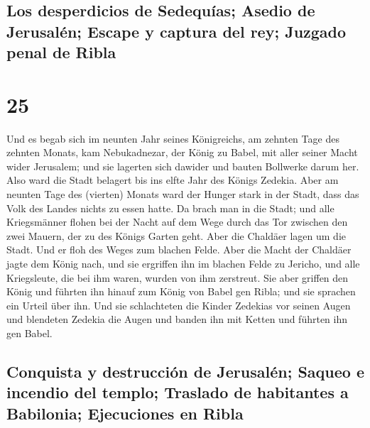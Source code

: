 \hypertarget{los-desperdicios-de-sedequuxedas-asedio-de-jerusaluxe9n-escape-y-captura-del-rey-juzgado-penal-de-ribla}{%
\subsection{Los desperdicios de Sedequías; Asedio de Jerusalén; Escape y
captura del rey; Juzgado penal de
Ribla}\label{los-desperdicios-de-sedequuxedas-asedio-de-jerusaluxe9n-escape-y-captura-del-rey-juzgado-penal-de-ribla}}

\hypertarget{section-24}{%
\section{25}\label{section-24}}

 Und es begab sich im neunten Jahr seines Königreichs, am
zehnten Tage des zehnten Monats, kam Nebukadnezar, der König zu Babel,
mit aller seiner Macht wider Jerusalem; und sie lagerten sich dawider
und bauten Bollwerke darum her.  Also ward die Stadt
belagert bis ins elfte Jahr des Königs Zedekia.  Aber am
neunten Tage des (vierten) Monats ward der Hunger stark in der Stadt,
dass das Volk des Landes nichts zu essen hatte.  Da brach
man in die Stadt; und alle Kriegsmänner flohen bei der Nacht auf dem
Wege durch das Tor zwischen den zwei Mauern, der zu des Königs Garten
geht. Aber die Chaldäer lagen um die Stadt. Und er floh des Weges zum
blachen Felde.  Aber die Macht der Chaldäer jagte dem
König nach, und sie ergriffen ihn im blachen Felde zu Jericho, und alle
Kriegsleute, die bei ihm waren, wurden von ihm zerstreut. 
Sie aber griffen den König und führten ihn hinauf zum König von Babel
gen Ribla; und sie sprachen ein Urteil über ihn.  Und sie
schlachteten die Kinder Zedekias vor seinen Augen und blendeten Zedekia
die Augen und banden ihn mit Ketten und führten ihn gen Babel.

\hypertarget{conquista-y-destrucciuxf3n-de-jerusaluxe9n-saqueo-e-incendio-del-templo-traslado-de-habitantes-a-babilonia-ejecuciones-en-ribla}{%
\subsection{Conquista y destrucción de Jerusalén; Saqueo e incendio del
templo; Traslado de habitantes a Babilonia; Ejecuciones en
Ribla}\label{conquista-y-destrucciuxf3n-de-jerusaluxe9n-saqueo-e-incendio-del-templo-traslado-de-habitantes-a-babilonia-ejecuciones-en-ribla}}


